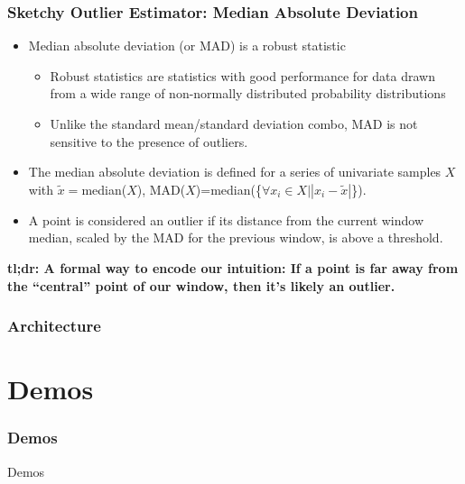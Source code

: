 \documentclass[aspectratio=169]{beamer}
\begin{document}
\begin{frame}
\frametitle{Sketchy Outlier Estimator: Median Absolute Deviation}
\begin{itemize}
\item Median absolute deviation (or MAD) is a robust statistic\pause
  \begin{itemize}
  \item Robust statistics are statistics with good performance for data drawn from a wide range of non-normally distributed probability distributions
  \item Unlike the standard mean/standard deviation combo, MAD is not sensitive to the presence of outliers.\pause
  \end{itemize}
\item The median absolute deviation is defined for a series of univariate samples $X$ with $\tilde{x}=$median($X$), MAD($X$)=median(\{$\forall x_i \in X \lvert |x_i - \tilde{x}|$\}).\pause
\item A point is considered an outlier if its distance from the current window median, scaled by the MAD for the previous window, is above a threshold.\pause
\end{itemize}
{\bf tl;dr: A formal way to encode our intuition: If a point is far away from the ``central'' point of our window, then it's likely an outlier. }
\end{frame}

\begin{frame}
\frametitle{Architecture}
\begin{center}
\end{center}
\end{frame}


\section{Demos}
\begingroup
\Huge
\begin{frame}
\frametitle{Demos}
\begin{center}
Demos
\end{center}
\end{frame}
\endgroup
\end{document}
